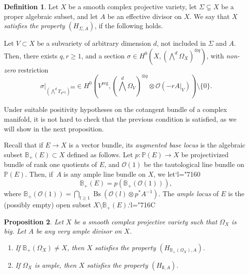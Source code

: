 \documentclass[JEP,XML,SOM,Unicode, NoEqCountersInSection,NoFloatCountersInSection,published]{cedram}
\let\mathcal\mathscr
\newcommand{\Changel}{\mathcode`l="7160}
\newcommand{\Changelback}{\mathcode`l="716C}
\newcommand{\reg}{\mathrm{reg}}
\DeclareMathOperator{\Bs}{Bs}
\theoremstyle{theorem}
\newtheorem{proposition}{Proposition} [section]
\theoremstyle{definition}
\newtheorem{definition}[proposition]{Definition}
\begin{document}
\begin{definition}
Let $X$ be a smooth complex projective variety, let $\Sigma \subsetneq X$ be a proper algebraic subset, and let $A$ be an effective divisor on $X$. We say that $X$ \emph{satisfies the property $(H_{\Sigma, A})$}, if the following holds.

Let $V \subset X$ be a subvariety of arbitrary dimension $d$, not included in $\Sigma$ and $A$. Then, there exists $q, r \geq 1$, and a section $\sigma \in H^0 (X, ( \bigwedge^d \Omega_X )^{\otimes q})$, with \emph{non-zero} restriction
\[
\sigma|_{(\bigwedge^d T_{V^\reg})^{\otimes q}} \in H^0 (V^{\reg}, ( \bigwedge^d \Omega_V )^{\otimes q} \otimes \mathcal O(- r A|_V))\setminus \{ 0 \}.
\]
\end{definition}

Under suitable positivity hypotheses on the cotangent bundle of a complex manifold, it is not hard to check that the previous condition is satisfied, as we will show in the next proposition.

Recall that if $E \to X$ is a vector bundle, its \emph{augmented base locus} is the algebraic subset $\mathbb{B}_+(E) \subset X$ defined as follows. Let $p : \mathbb P(E) \to X$ be projectivized bundle of rank one quotients of $E$, and $\mathcal O(1)$ be the tautological line bundle on $\mathbb P(E)$. Then, if~$A$ is any ample line bundle on $X$, we let\Changel
\[
\mathbb{B}_+(E) = p( \mathbb{B_+}(\mathcal O(1))),
\]
where $\mathbb B_+ (\mathcal O(1)) = \bigcap_{l \geq 1} \Bs(\mathcal O(l) \otimes p^\ast A^{-1})$. The \emph{ample locus} of $E$ is the (possibly empty) open subset $X \setminus \mathbb B_+(E)$.\Changelback

\begin{proposition} \label{propbigample}
Let $X$ be a smooth complex projective variety such that $\Omega_X$ is big. Let $A$ be any very ample divisor on $X$.

\begin{enumerate}
\item If $\mathbb B_+(\Omega_X) \neq X$, then $X$ satisfies the property $(H_{\mathbb B_+(\Omega_X), A})$.

\item If $\Omega_X$ is ample, then $X$ satisfies the property $(H_{\emptyset, A})$.
\end{enumerate}
\end{proposition}
\end{document}
